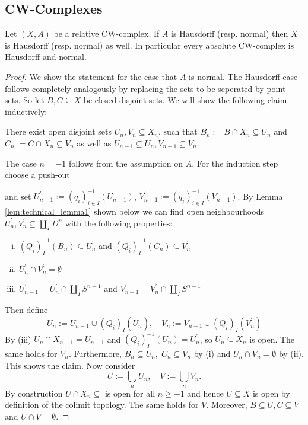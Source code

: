\subsection{CW-Complexes}

\begin{proposition}
    Let $(X,A)$ be a relative CW-complex. If $A$ is Hausdorff (resp. normal) then $X$ is Hausdorff (resp. normal) as well. In particular every absolute CW-complex is Hausdorff and normal.
\end{proposition}
\begin{proof}
    We show the statement for the case that $A$ is normal. The Hausdorff case follows completely analogously by replacing the sets to be seperated by point sets. So let $B,C \subseteq X$ be closed disjoint sets. We will show the following claim inductively:
    \begin{claim}
    There exist open disjoint sets $U_n,V_n \subseteq X_n$, such that $B_n := B \cap X_n \subseteq U_n$ and $C_n := C \cap X_n \subseteq V_n$ as well as $U_{n-1} \subseteq U_n, V_{n-1} \subseteq V_n$.
    \end{claim}
    The case $n=-1$ follows from the assumption on $A$. For the induction step choose a push-out
    \begin{center}
    \end{center}
    and set $U_{n-1}^\prime := (q_i)^{-1}_{i \in I}(U_{n-1})$, $V_{n-1}^\prime := (q_i)^{-1}_{i \in I}(V_{n-1})$. By Lemma \ref{lem:technical_lemma1} shown below we can find open neighbourhoods $U_n^\prime,V_n^\prime \subseteq \coprod_I D^n$ with the following properties:
    \begin{enumerate}[(i)]
        \item $(Q_i)_I^{-1}(B_n) \subseteq U_n^\prime$ and $(Q_i)_I^{-1}(C_n) \subseteq V_n^\prime$
        \item $U_n^\prime \cap V_n^\prime = \emptyset$
        \item $U_{n-1}^\prime = U_n^\prime \cap \coprod_I S^{n-1}$ and $V_{n-1}^\prime = V_n^\prime \cap \coprod_I S^{n-1}$ 
    \end{enumerate}
    Then define 
    \[
    U_n := U_{n-1} \cup (Q_i)_I(U_n^\prime), \quad V_n := V_{n-1} \cup (Q_i)_I(V_n^\prime)
    \]
    By (iii) $U_n \cap X_{n-1} = U_{n-1}$ and $(Q_i)_I^{-1}(U_n) = U_n^\prime$, so $U_n \subseteq X_n$ is open. The same holds for $V_n$. Furthermore, $B_n \subseteq U_n, \; C_n \subseteq V_n$ by (i) and $U_n \cap V_n = \emptyset$ by (ii). This shows the claim. Now consider
    \[
    U := \bigcup_n U_n, \quad V := \bigcup_n V_n.
    \] 
    By construction $U \cap X_n \subseteq$ is open for all $n \geq -1$ and hence $U \subseteq X$ is open by definition of the colimit topology. The same holds for $V$. Moreover, $B \subseteq U, C \subseteq V$ and $U \cap V = \emptyset$. 
\end{proof}

